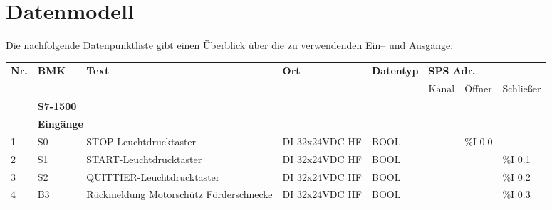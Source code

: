 \section{Datenmodell}

Die nachfolgende Datenpunktliste gibt einen Überblick über die zu verwendenden Ein– und Ausgänge:

\begin{table}[H]
    \tiny
    \begin{longtable}{|llllllll|}
        \hline
        \multicolumn{1}{|l|}{\multirow{2}{*}{\textbf{Nr.}}} &
        \multicolumn{1}{l|}{\multirow{2}{*}{\textbf{BMK}}} &
        \multicolumn{1}{l|}{\multirow{2}{*}{\textbf{Text}}} &
        \multicolumn{1}{l|}{\multirow{2}{*}{\textbf{Ort}}} &
        \multicolumn{1}{l|}{\multirow{2}{*}{\textbf{Datentyp}}} &
        \multicolumn{3}{l|}{\textbf{SPS Adr.}} \\ \cline{6-8}
        \multicolumn{1}{|l|}{} & \multicolumn{1}{l|}{} & \multicolumn{1}{l|}{} & \multicolumn{1}{l|}{} &\multicolumn{1}{l|}{} & \multicolumn{1}{l|}{Kanal} & \multicolumn{1}{l|}{Öffner} & Schließer \\ \hline
        \endfirsthead
        \endhead
        \hline
        \endfoot
        \endlastfoot
        \rowcolor{grey}
        \multicolumn{3}{|l}{} & \textbf{S7-1500} & \multicolumn{4}{l|}{} \\ \hline
        \rowcolor{lightGrey}
        & \multicolumn{7}{l|}{\textbf{Eingänge}} \\ \hline
        \multicolumn{1}{|l|}{1} & \multicolumn{1}{l|}{S0} & \multicolumn{1}{l|}{STOP-Leuchtdrucktaster} & \multicolumn{1}{l|}{DI 32x24VDC HF} & \multicolumn{1}{l|}{BOOL} & \multicolumn{1}{l|}{} & \multicolumn{1}{l|}{\%I 0.0} & \\
        \multicolumn{1}{|l|}{2} & \multicolumn{1}{l|}{S1} & \multicolumn{1}{l|}{START-Leuchtdrucktaster} & \multicolumn{1}{l|}{DI 32x24VDC HF} & \multicolumn{1}{l|}{BOOL} & \multicolumn{1}{l|}{} & \multicolumn{1}{l|}{} & \%I 0.1 \\
        \multicolumn{1}{|l|}{3} & \multicolumn{1}{l|}{S2} & \multicolumn{1}{l|}{QUITTIER-Leuchtdrucktaster} & \multicolumn{1}{l|}{DI 32x24VDC HF} & \multicolumn{1}{l|}{BOOL} & \multicolumn{1}{l|}{} & \multicolumn{1}{l|}{} & \%I 0.2 \\
        \multicolumn{1}{|l|}{4} & \multicolumn{1}{l|}{B3} & \multicolumn{1}{l|}{Rückmeldung Motorschütz Förderschnecke} & \multicolumn{1}{l|}{DI 32x24VDC HF} & \multicolumn{1}{l|}{BOOL} & \multicolumn{1}{l|}{} & \multicolumn{1}{l|}{} & \%I 0.3 \\

\end{longtable}
\end{table}
